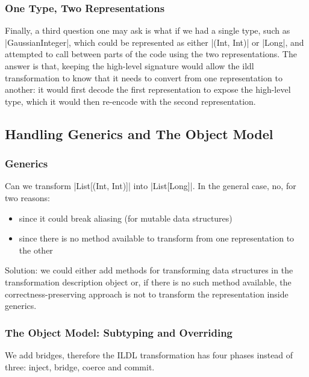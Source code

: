 \subsubsection{One Type, Two Representations}

Finally, a third question one may ask is what if we had a single type, such as |GaussianInteger|, which could be represented as either |(Int, Int)| or |Long|, and attempted to call between parts of the code using the two representations. The answer is that, keeping the high-level signature would allow the ildl transformation to know that it needs to convert from one representation to another: it would first decode the first representation to expose the high-level type, which it would then re-encode with the second representation.

\subsection{Handling Generics and The Object Model}
\label{sec:ildl:generics}

\subsubsection{Generics}

Can we transform |List[(Int, Int)]| into |List[Long]|. In the general case, no, for two reasons:
\begin{itemize}
  \item since it could break aliasing (for mutable data structures)
  \item since there is no method available to transform from one representation to the other
\end{itemize}

Solution: we could either add methods for transforming data structures in the transformation description object or, if there is no such method available, the correctness-preserving approach is not to transform the representation inside generics.


\subsubsection{The Object Model: Subtyping and Overriding}
We add bridges, therefore the ILDL transformation has four phases instead of three: inject, bridge, coerce and commit.


